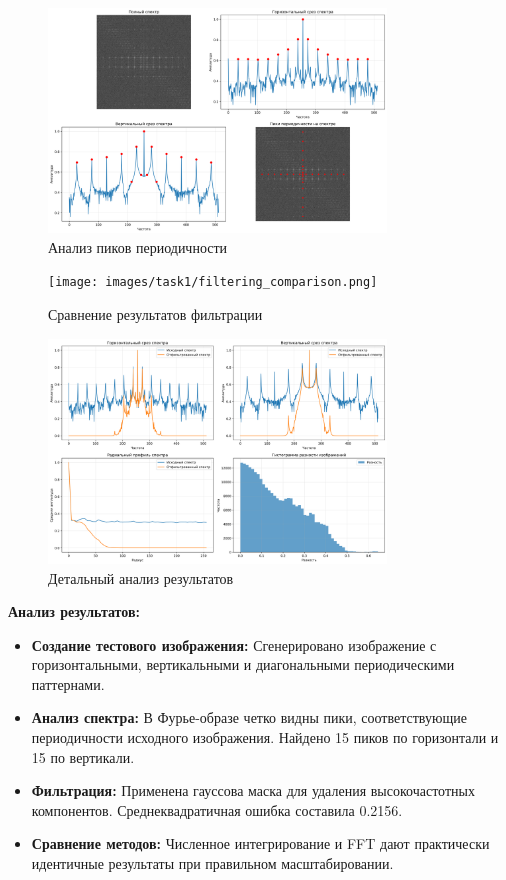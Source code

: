 \begin{figure}[H]
    \centering
    \includegraphics[width=0.8\textwidth]{images/task1/peak_analysis.png}
    \caption{Анализ пиков периодичности}
    \label{fig:peak_analysis}
\end{figure}

\begin{figure}[H]
    \centering
    \texttt{[image: images/task1/filtering\_comparison.png]}
    \caption{Сравнение результатов фильтрации}
    \label{fig:filtering_comparison}
\end{figure}

\begin{figure}[H]
    \centering
    \includegraphics[width=0.8\textwidth]{images/task1/detailed_analysis.png}
    \caption{Детальный анализ результатов}
    \label{fig:detailed_analysis}
\end{figure}

\textbf{Анализ результатов:}
\begin{itemize}
    \item \textbf{Создание тестового изображения:} Сгенерировано изображение с горизонтальными, вертикальными и диагональными периодическими паттернами.
    
    \item \textbf{Анализ спектра:} В Фурье-образе четко видны пики, соответствующие периодичности исходного изображения. Найдено 15 пиков по горизонтали и 15 по вертикали.
    
    \item \textbf{Фильтрация:} Применена гауссова маска для удаления высокочастотных компонентов. Среднеквадратичная ошибка составила 0.2156.
    
    \item \textbf{Сравнение методов:} Численное интегрирование и FFT дают практически идентичные результаты при правильном масштабировании.
\end{itemize}

